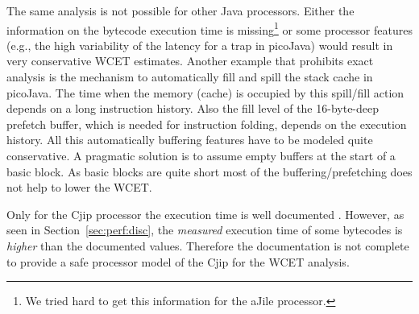 The same analysis is not possible for other Java processors. Either
the information on the bytecode execution time is
missing\footnote{We tried hard to get this information for the aJile
processor.} or some processor features (e.g., the high variability
of the latency for a trap in picoJava) would result in very
conservative WCET estimates. Another example that prohibits exact
analysis is the mechanism to automatically fill and spill the stack
cache in picoJava. The time when the memory (cache) is occupied by
this spill/fill action depends on a long instruction history. Also
the fill level of the 16-byte-deep prefetch buffer, which is needed
for instruction folding, depends on the execution history. All this
automatically buffering features have to be modeled quite
conservative. A pragmatic solution is to assume empty buffers at the
start of a basic block. As basic blocks are quite short most of the
buffering/prefetching does not help to lower the WCET.

Only for the Cjip processor the execution time is well documented
\cite{CjipRef}. However, as seen in Section~\ref{sec:perf:disc}, the
\emph{measured} execution time of some bytecodes is \emph{higher}
than the documented values. Therefore the documentation is not
complete to provide a safe processor model of the Cjip for the WCET
analysis.
